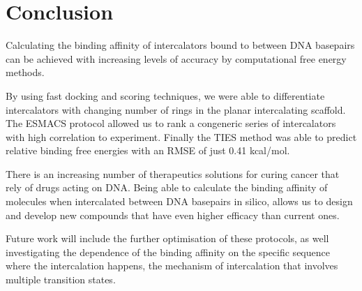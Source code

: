\chapter{Conclusion}

Calculating the binding affinity of intercalators bound to between DNA basepairs can be achieved with increasing levels of accuracy by computational free energy methods. 

By using fast docking and scoring techniques, we were able to differentiate intercalators with changing number of rings in the planar intercalating scaffold. The ESMACS protocol allowed us to rank a congeneric series of intercalators with high correlation to experiment. Finally the TIES method was able to predict relative binding free energies with an RMSE of just 0.41 kcal/mol. 

There is an increasing number of therapeutics solutions for curing cancer that rely of drugs acting on DNA. Being able to calculate the binding affinity of molecules when intercalated between DNA basepairs in silico, allows us to design and develop new compounds that have even higher efficacy than current ones. 

Future work will include the further optimisation of these protocols, as well investigating the dependence of the binding affinity on the specific sequence where the intercalation happens, the mechanism of intercalation that involves multiple transition states. 
